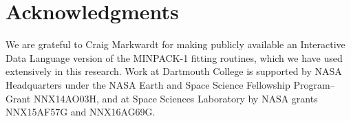 

  
  \section*{Acknowledgments}

  We are grateful to Craig Markwardt for making publicly available an
  Interactive Data Language version of the MINPACK-1 fitting routines, which we
  have used extensively in this research. Work at Dartmouth College is supported
  by NASA Headquarters under the NASA Earth and Space Science Fellowship
  Program--Grant NNX14AO03H, and at Space Sciences Laboratory by NASA grants
  NNX15AF57G and NNX16AG69G.



